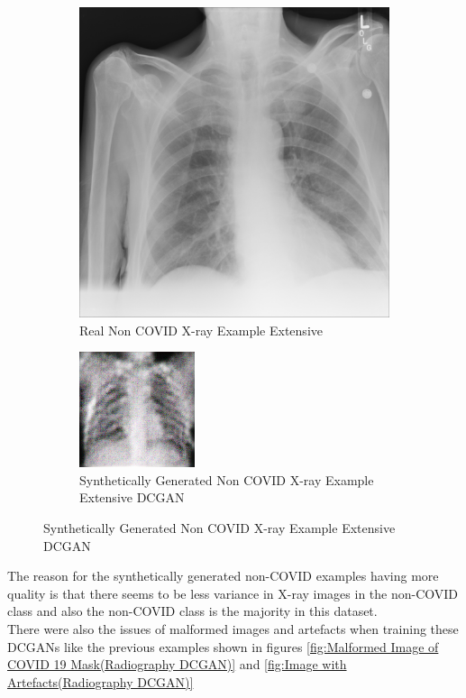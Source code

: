  \begin{figure}[H]
    \centering
    \begin{subfigure}{.4\textwidth}
    \centering
      \includegraphics[width=.4\linewidth,keepaspectratio]{Images/ExampleOfNonCOVIDXray.png}
      \caption{Real Non COVID X-ray Example Extensive}
      \label{fig:Real Non COVID X-ray Example Extensive}
    \end{subfigure}\hfill%
    \begin{subfigure}{.4\textwidth}
    \centering
      \includegraphics[width=.4\linewidth,keepaspectratio]{Images/ExampleOfSyntheticNonCOVIDXrayExtensiveDCGAN.png}
      \caption{Synthetically Generated Non COVID X-ray Example Extensive DCGAN}
      \label{fig:Synthetically Generated Non COVID X-ray Example Extensive DCGAN}
    \end{subfigure}\hfill%
\end{figure}
The reason for the synthetically generated non-COVID examples having more quality is that there seems to be less variance in X-ray images in the non-COVID class and also the non-COVID class is the majority in this dataset.
\\
There were also the issues of malformed images and artefacts when training these DCGANs like the previous examples shown in figures \ref{fig:Malformed Image of COVID 19 Mask(Radiography DCGAN)} and \ref{fig:Image with Artefacts(Radiography DCGAN)}
